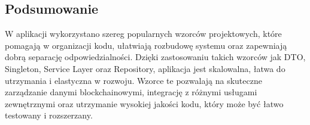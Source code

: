 \subsection{Podsumowanie}

W aplikacji wykorzystano szereg popularnych wzorców projektowych, które pomagają w organizacji kodu, ułatwiają rozbudowę systemu oraz zapewniają dobrą separację odpowiedzialności. Dzięki zastosowaniu takich wzorców jak DTO, Singleton, Service Layer oraz Repository, aplikacja jest skalowalna, łatwa do utrzymania i elastyczna w rozwoju. Wzorce te pozwalają na skuteczne zarządzanie danymi blockchainowymi, integrację z różnymi usługami zewnętrznymi oraz utrzymanie wysokiej jakości kodu, który może być łatwo testowany i rozszerzany.
